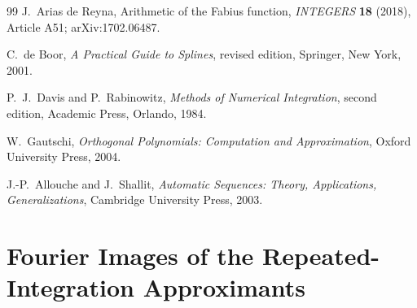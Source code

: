 \documentclass[11pt,oneside]{article}
\numberwithin{equation}{section}
\theoremstyle{definition}
\theoremstyle{remark}
\begin{document}
\begin{thebibliography}{99}
J.~Arias de Reyna,
\newblock Arithmetic of the Fabius function,
\newblock \emph{INTEGERS} \textbf{18} (2018), Article A51;
arXiv:1702.06487.

C.~de Boor,
\newblock \emph{A Practical Guide to Splines}, revised edition,
\newblock Springer, New York, 2001.

P.~J.~Davis and P.~Rabinowitz,
\newblock \emph{Methods of Numerical Integration}, second edition,
\newblock Academic Press, Orlando, 1984.

W.~Gautschi,
\newblock \emph{Orthogonal Polynomials: Computation and Approximation},
\newblock Oxford University Press, 2004.

J.-P.~Allouche and J.~Shallit,
\newblock \emph{Automatic Sequences: Theory, Applications, Generalizations},
\newblock Cambridge University Press, 2003.

\end{thebibliography}



\setcounter{section}{0}
\renewcommand{\thesection}{\arabic{section}}
\part{Fourier Images of the Repeated-Integration Approximants}
\end{document}
